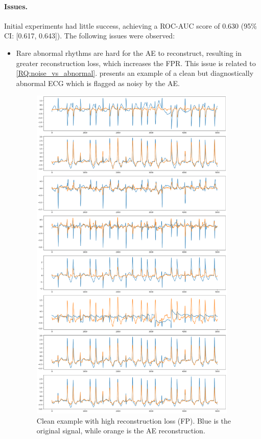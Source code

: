\documentclass[a4paper,10pt]{article}
\begin{document}
\paragraph{Issues.} Initial experiments had little success, achieving a ROC-AUC score of 0.630 (95\% CI: [0.617, 0.643]). The following issues were observed:
\begin{itemize}
	\item Rare abnormal rhythms are hard for the AE to reconstruct, resulting in greater reconstruction loss, which increases the FPR. This issue is related to \ref{RQ:noise_vs_abnormal}.  presents an example of a clean but diagnostically abnormal ECG which is flagged as noisy by the AE.

	\begin{figure}[htbp]
		\centering
		\includegraphics[width=0.93\textwidth]{fp_example.png}
		\caption{Clean example with high reconstruction loss (FP). Blue is the original signal, while orange is the AE reconstruction.}%
		\label{fig:fp_example}
	\end{figure}


\end{itemize}
\end{document}
